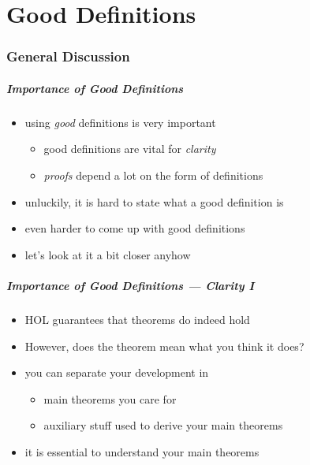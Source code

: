 \part{Good Definitions}

\frame[plain]{\partpage}

\section{General Discussion}

\begin{frame}
\frametitle{Importance of Good Definitions}
\begin{itemize}
\item using \textit{good} definitions is very important
\begin{itemize}
\item good definitions are vital for \emph{clarity}
\item \emph{proofs} depend a lot on the form of definitions
\end{itemize}
\item unluckily, it is hard to state what a good definition is
\item even harder to come up with good definitions
\item let's look at it a bit closer anyhow
\end{itemize}
\end{frame}

\begin{frame}
\frametitle{Importance of Good Definitions --- Clarity I}
\begin{itemize}
\item HOL guarantees that theorems do indeed hold
\item However, does the theorem mean what you think it does?
\item you can separate your development in
\begin{itemize}
\item main theorems you care for
\item auxiliary stuff used to derive your main theorems
\end{itemize}
\item it is essential to understand your main theorems
\end{itemize}
\end{frame}


